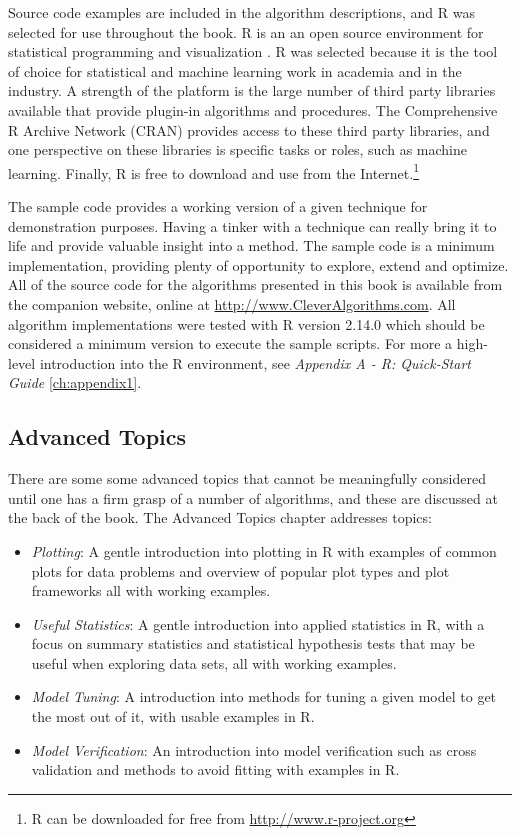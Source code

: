 Source code examples are included in the algorithm descriptions, and R was selected for use throughout the book. R is an an open source environment for statistical programming and visualization \cite{RDevelopmentCoreTeam2011}. R was selected because it is the tool of choice for statistical and machine learning work in academia and in the industry. A strength of the platform is the large number of third party libraries available that provide plugin-in algorithms and procedures. The Comprehensive R Archive Network (CRAN) provides access to these third party libraries, and one perspective on these libraries is specific tasks or roles, such as machine learning. Finally, R is free to download and use from the Internet.\footnote{R can be downloaded for free from \url{http://www.r-project.org}}

The sample code provides a working version of a given technique for demonstration purposes. Having a tinker with a technique can really bring it to life and provide valuable insight into a method. The sample code is a minimum implementation, providing plenty of opportunity to explore, extend and optimize.
All of the source code for the algorithms presented in this book is available from the companion website, online at \url{http://www.CleverAlgorithms.com}. All algorithm implementations were tested with R version 2.14.0 which should be considered a minimum version to execute the sample scripts. 
For more a high-level introduction into the R environment, see \emph{Appendix A - R: Quick-Start Guide} \ref{ch:appendix1}.

\subsection{Advanced Topics}
There are some some advanced topics that cannot be meaningfully considered until one has a firm grasp of a number of algorithms, and these are discussed at the back of the book. 
The Advanced Topics chapter addresses topics:

\begin{itemize}
	\item \emph{Plotting}: A gentle introduction into plotting in R with examples of common plots for data problems and overview of popular plot types and plot frameworks all with working examples.
	\item \emph{Useful Statistics}: A gentle introduction into applied statistics in R, with a focus on summary statistics and statistical hypothesis tests that may be useful when exploring data sets, all with working examples.
	\item \emph{Model Tuning}: A introduction into methods for tuning a given model to get the most out of it, with usable examples in R.
	\item \emph{Model Verification}: An introduction into model verification such as cross validation and methods to avoid fitting with examples in R.
\end{itemize}

